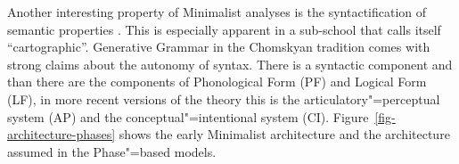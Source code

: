 \documentclass[output=paper]{langsci/langscibook}
\begin{document}
Another interesting property of Minimalist analyses is the syntactification of semantic
properties \citep{Rizzi2014a}. This is especially apparent in a sub-school that calls itself
``cartographic''. Generative Grammar in the Chomskyan tradition comes with strong
claims about the autonomy of syntax. There is a syntactic component and than there are the components
of Phonological Form (PF) and Logical Form (LF), in more recent versions of the theory this is the
articulatory"=perceptual system (AP) and the conceptual"=intentional system (CI). Figure~\ref{fig-architecture-phases} shows
the early Minimalist architecture and the architecture assumed in the Phase"=based models.
\begin{figure}
\hfill
{}
\hfill
{}
\end{figure}
\end{document}
